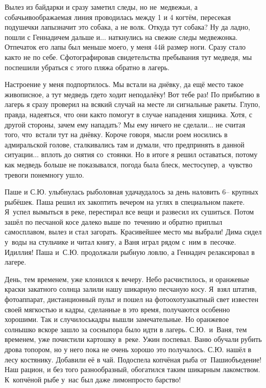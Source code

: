 Вылез из байдарки и сразу заметил следы, но не~медвежьи, а собачьи\mdash воображаемая линия проводилась между 1 и 4 когтём, пересекая подушечки лапы\mdash значит это собака, а не волк. Откуда тут собака? Ну да ладно, пошли с Геннадичем дальше и$\ldots$ наткнулись на свежие следы медвежонка. Отпечаток его лапы был меньше моего, у меня 44\sdash й размер ноги. Сразу стало как\sdash то не по себе. Сфотографировав свидетельства пребывания тут медведя, мы поспешили убраться с этого пляжа обратно в лагерь. 

Настроение у меня подпортилось. Мы встали на днёвку, да ещё место такое живописное, а тут медведь где\sdash то ходит неподалёку! Вот тебе раз! По прибытию в лагерь я сразу проверил на всякий случай на месте ли сигнальные ракеты. Глупо, правда, надеяться, что они как\sdash то помогут в случае нападения хищника. Хотя, с другой стороны, зачем ему нападать? Мы ему ничего не сделали$\ldots$ не считая того, что~встали тут на днёвку. Короче говоря, мысли роем носились в адмиральской голове, сталкивались там и думали, что предпринять в данной ситуации$\ldots$ вплоть до снятия со~стоянки. Но в итоге я решил оставаться, потому как медведь больше не показывался, погода была блеск, место\mdash супер, а~чувство тревоги понемногу ушло. 

Паше и С.Ю. улыбнулась рыболовная удача\mdash удалось за день наловить 6\thinspace\nobreakdash-- крупных рыбёшек. Паша решил их закоптить вечером на углях в специальном пакете. Я~успел вымыться в реке, перестирал все вещи и развесил их сушиться. Потом зашёл по песчаной косе далеко выше по~течению и обратно приплыл самосплавом, вылез и стал загорать. Красивейшее место мы выбрали! Дима сидел у~воды на стульчике и читал книгу, а Ваня играл рядом с~ним в~песочке. Идиллия! Паша и~С.Ю. продолжали рыбную ловлю, а Геннадич релаксировал в лагере.

День, тем временем, уже клонился к вечеру. Небо расчистилось, и оранжевые краски закатного солнца залили нашу шикарную песчаную косу. Я~взял штатив, фотоаппарат, дистанционный пульт и пошел на фотоохоту\mdash закатный свет известен своей мягкостью и кадры, сделанные в это время, получаются особенно хорошими. Так и случилось\mdash кадры вышли замечательные. Но оранжевое солнышко вскоре зашло за сосны\mdash пора было идти в лагерь. С.Ю.~и~Ваня, тем временем, уже почистили картошку в~реке. Ужин поспевал. Ваню обучали рубить дрова топором, но у него пока не очень хорошо это получалось. С.Ю. нашёл в лесу костянику. Добавили её в чай. Подоспела копчёная рыба от~Паши\mdash объедение! Наш рацион, и без того разнообразный, обогатился таким шикарным лакомством. К~копчёной рыбе у~нас был даже лимон\mdash просто барство! 

